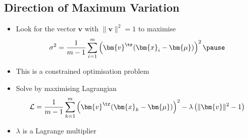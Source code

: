 \begin{slide}
\section{Direction of Maximum Variation}

\begin{PauseHighLight}
  \begin{itemize}
  \item Look for the vector $\bm{v}$ with $\|\bm{v}\|^2=1$ to maximise
    \begin{align*}
      \sigma^2 = \frac{1}{m-1} \sum_{i=1}^m \left( \bm{v}^\tr
      (\bm{x}_i-\bm{\mu}) \right)^2\pause
    \end{align*}
  \item This is a constrained optimisation problem\pause
  \item Solve by maximising Lagrangian
    \begin{align*}
      \mathcal{L} = \frac{1}{m-1} \sum_{k=1}^m \left( \bm{v}^\tr
      (\bm{x}_k-\bm{\mu}) \right)^2 - \lambda \left(\|\bm{v}\|^2-1\right)
    \end{align*}
  \item $\lambda$ is a Lagrange multiplier\pause
  \end{itemize}
\end{PauseHighLight}

\end{slide}



